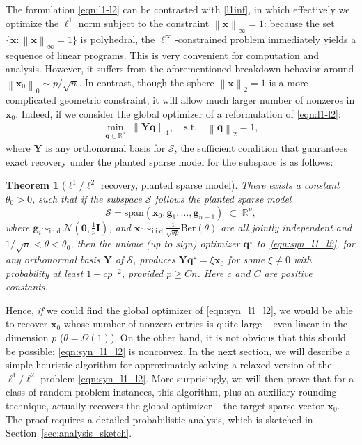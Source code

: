 \documentclass[11pt, journal, final]{IEEEtran}
\numberwithin{equation}{section}
\newtheorem{theorem}{Theorem}[section]
\newcommand{\R}{\mathbb{R}}
\newcommand{\mb}{\mathbf}
\newcommand{\mc}{\mathcal}
\newcommand{\norm}[1]{\left\lVert#1\right\rVert}
\begin{document}
{The formulation \eqref{eqn:l1-l2} can be contrasted with \eqref{l1inf}, in which effectively we optimize the $\ell^1$ norm subject to the constraint $\norm{\mb x}_\infty = 1$: because the set $\{\mb x: \norm{\mb x}_\infty = 1\}$ is polyhedral, the $\ell^\infty$-constrained problem immediately yields a sequence of linear programs. This is very convenient for computation and analysis. However, it suffers from the aforementioned breakdown behavior around $\norm{\mb x_0}_0 \sim p / \sqrt{n}$. In contrast, though the sphere $\norm{\mb x}_{2} = 1$ is a more complicated geometric constraint, it will allow much larger number of nonzeros in $\mb x_0$. Indeed, if we consider the global optimizer of a reformulation of \eqref{eqn:l1-l2}:
\begin{align} \label{eqn:syn_l1_l2}
\min_{\mb q \in \R^n} \; \norm{\mb Y \mb q }_1, \quad \text{s.t.} \quad \norm{\mb q}_{2} = 1,
\end{align}
where $\mb Y$ is any orthonormal basis for $\mc S$, the sufficient condition that guarantees exact recovery under the planted sparse model for the subspace is as follows:
\begin{theorem}[$\ell^1/\ell^2$ recovery, planted sparse model] \label{thm:global}
There exists a constant $\theta_0 > 0$, such that if the subspace $\mc S$ follows the planted sparse model
\begin{equation*}
\mc S = \mathrm{span}\left( \mb x_0, \mb g_1, \dots, \mb g_{n-1} \right) \;\subset\; \R^p,
\end{equation*}
where $\mb g_i \sim_{\text{i.i.d.}} \mc N(\mb 0,\frac{1}{p} \mb I)$, and $\mb x_0 \sim_{\text{i.i.d.}} \tfrac{1}{\sqrt{\theta p}} \mathrm{Ber}(\theta)$ are all jointly independent and $1/\sqrt{n} < \theta < \theta_0$, then the unique (up to sign) optimizer $\mb q^\star$ to~\eqref{eqn:syn_l1_l2}, for any orthonormal basis $\mb Y$ of $\mc S$, produces $\mb Y \mb q^\star = \xi \mb x_0$ for some $\xi \neq 0$ with probability at least $1- cp^{-2}$, provided $p \geq Cn$. Here $c$ and $C$ are positive constants.
\end{theorem}

Hence, {\em if} we could find the global optimizer of \eqref{eqn:syn_l1_l2}, we would be able to recover $\mb x_0$ whose number of nonzero entries is quite large -- even linear in the dimension $p$ ($\theta = \Omega(1)$). On the other hand, it is not obvious that this should be possible: \eqref{eqn:syn_l1_l2} is nonconvex. In the next section, we will describe a simple heuristic algorithm for approximately solving a relaxed version of the $\ell^1/\ell^2$ problem \eqref{eqn:syn_l1_l2}. More surprisingly, we will then prove that for a class of random problem instances, this algorithm, plus an auxiliary rounding technique, actually recovers the global optimizer -- the target sparse vector $\mb x_0$. The proof requires a detailed probabilistic analysis, which is sketched in Section~\ref{sec:analysis_sketch}.

}
\end{document}
